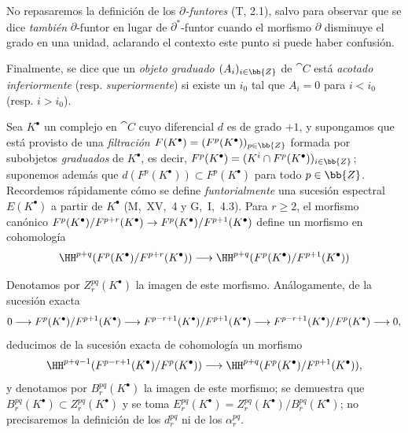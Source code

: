 \documentclass[oneside]{amsart}
\makeatletter
\renewcommand{\geq}{\geqslant}
\newcommand{\ega@arrow}[2]{\mathchoice{#1}{#2}{#2}{#2}}
\renewcommand{\to}{\ega@arrow{\longrightarrow}{\rightarrow}}
\newcommand{\oldpage}[2][]{{\marginnote{\normalfont\textbf{#1}~|~#2}}\ignorespaces}
\let\EGAOriginalLabel\label
\renewcommand{\label}[1]{\phantomsection\EGAOriginalLabel{#1}}
\makeatother
\begin{document}
\begin{env}[11.2.1]
No repasaremos la definición de los \emph{$\partial$-funtores} (T, 2.1), salvo para observar que se dice \emph{también} $\partial$-funtor en lugar de $\partial^*$-funtor cuando el morfismo $\partial$ disminuye el grado en una unidad, aclarando el contexto este punto si puede haber confusión.

Finalmente, se dice que un \emph{objeto graduado $(A_i)_{i\in\bb{Z}}$} de $\cat{C}$ está \emph{acotado inferiormente} (resp. \emph{superiormente}) si existe un $i_0$ tal que $A_i=0$ para $i<i_0$ (resp. $i>i_0$).
\end{env}

\begin{env}[11.2.2]
\label{0.11.2.2}
Sea $K^\bullet$ un complejo en $\cat{C}$ cuyo diferencial $d$ es de grado $+1$, y supongamos que está provisto de una \emph{filtración $F(K^\bullet)=(F^p(K^\bullet))_{p\in\bb{Z}}$} formada por subobjetos \emph{graduados}
\oldpage[0\textsubscript{III}]{28}
de $K^\bullet$, es decir, $F^p(K^\bullet)=(K^i\cap F^p(K^\bullet))_{i\in\bb{Z}}$; suponemos además que $d(F^p(K^\bullet))\subset F^p(K^\bullet)$ para todo $p\in\bb{Z}$.
Recordemos rápidamente cómo se define \emph{funtorialmente} una sucesión espectral $E(K^\bullet)$ a partir de $K^\bullet$ (M,~XV,~4 y G,~I,~4.3).
Para $r\geq 2$, el morfismo canónico $F^p(K^\bullet)/F^{p+r}(K^\bullet)\to F^p(K^\bullet)/F^{p+1}(K^\bullet)$ define un morfismo en cohomología
\[
  \HH^{p+q}(F^p(K^\bullet)/F^{p+r}(K^\bullet))\to\HH^{p+q}(F^p(K^\bullet)/F^{p+1}(K^\bullet))
\]

Denotamos por $Z_r^{pq}(K^\bullet)$ la imagen de este morfismo.
Análogamente, de la sucesión exacta
\[
  0\to F^p(K^\bullet)/F^{p+1}(K^\bullet)\to F^{p-r+1}(K^\bullet)/F^{p+1}(K^\bullet)\to F^{p-r+1}(K^\bullet)/F^p(K^\bullet)\to 0,
\]
deducimos de la sucesión exacta de cohomología un morfismo
\[
  \HH^{p+q-1}(F^{p-r+1}(K^\bullet)/F^p(K^\bullet))\to\HH^{p+q}(F^p(K^\bullet)/F^{p+1}(K^\bullet)),
\]
y denotamos por $B_r^{pq}(K^\bullet)$ la imagen de este morfismo; se demuestra que $B_r^{pq}(K^\bullet)\subset Z_r^{pq}(K^\bullet)$ y se toma $E_r^{pq}(K^\bullet)=Z_r^{pq}(K^\bullet)/B_r^{pq}(K^\bullet)$; no precisaremos la definición de los $d_r^{pq}$ ni de los $\alpha_r^{pq}$.


\end{env}
\end{document}
